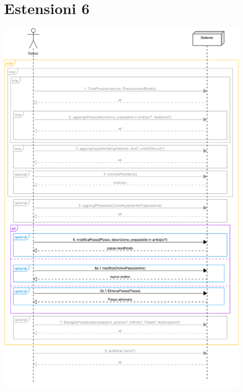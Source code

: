 \section*{Estensioni 6}
\begin{center}
  \includegraphics[max width=\textwidth, max height=190mm]{../resources/img/GRP/SSD/ext6.png}
\end{center}

